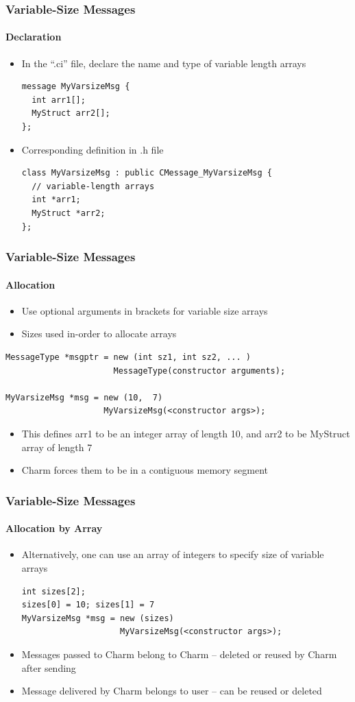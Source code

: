 \begin{frame}[fragile]
  \frametitle{Variable-Size Messages}
  \framesubtitle{Declaration}
  \begin{itemize}
    \item In the “.ci” file, declare the name and type of variable length arrays
    \begin{lstlisting}
message MyVarsizeMsg {
  int arr1[];
  MyStruct arr2[];
};
    \end{lstlisting}
    \item Corresponding definition in .h file
    \begin{lstlisting}
class MyVarsizeMsg : public CMessage_MyVarsizeMsg {
  // variable-length arrays
  int *arr1;
  MyStruct *arr2;
};
    \end{lstlisting}
  \end{itemize}
\end{frame}

\begin{frame}[fragile]
  \frametitle{Variable-Size Messages}
  \framesubtitle{Allocation}
  \begin{itemize}
    \item Use optional arguments in brackets for variable size arrays
    \item Sizes used in-order to allocate arrays
  \end{itemize}
  \begin{lstlisting}
MessageType *msgptr = new (int sz1, int sz2, ... ) 
                      MessageType(constructor arguments);

MyVarsizeMsg *msg = new (10,  7)        
                    MyVarsizeMsg(<constructor args>);
  \end{lstlisting}
  \begin{itemize}
    \item This defines arr1 to be an integer array of length 10, and arr2 to be MyStruct array of length 7
    \item Charm forces them to be in a contiguous memory segment
  \end{itemize}
\end{frame}

\begin{frame}[fragile]
  \frametitle{Variable-Size Messages}
  \framesubtitle{Allocation by Array}
  \begin{itemize}
    \item Alternatively, one can use an array of integers to specify size of variable arrays
    \begin{lstlisting}
int sizes[2];
sizes[0] = 10; sizes[1] = 7
MyVarsizeMsg *msg = new (sizes)        
                    MyVarsizeMsg(<constructor args>);
    \end{lstlisting}
    \item Messages passed to Charm belong to Charm – deleted or reused by Charm after sending
    \item Message delivered by Charm belongs to user – can be reused or deleted
  \end{itemize}
\end{frame}

